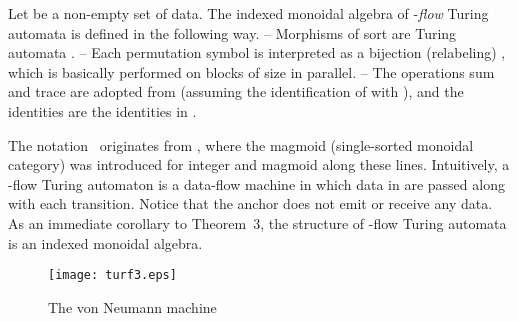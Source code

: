 \documentclass{eptcs}
\begin{document}
Let  be a non-empty set of data. The indexed monoidal algebra \dil  of
-{\em flow\/} Turing automata is defined in the following way.
\vsp\newline
-- Morphisms of sort  are Turing automata .
\newline
-- Each permutation symbol  is interpreted as a bijection (relabeling)
, which is basically  performed on blocks
of size  in parallel.
\newline
-- The operations sum and trace are adopted from  (assuming the identification
of  with ), and
the identities  are the identities  in .
\vsp

  The notation \dil\ originates from \cite{arnold}, where the magmoid
(single-sorted monoidal category) \dil  was introduced for integer
 and magmoid  along these lines. Intuitively, a -flow Turing
automaton is a data-flow machine in which data in  are passed along with
each transition. Notice that the anchor does not emit or receive any data. As
an immediate corollary to Theorem~3, the structure \dil  of
-flow Turing automata is an indexed monoidal algebra. 
\begin{figure}[h]
\begin{center}
\texttt{[image: turf3.eps]}
\end{center}
\vspmini
\caption{The von Neumann machine}
\vspmini
\end{figure}
\end{document}

